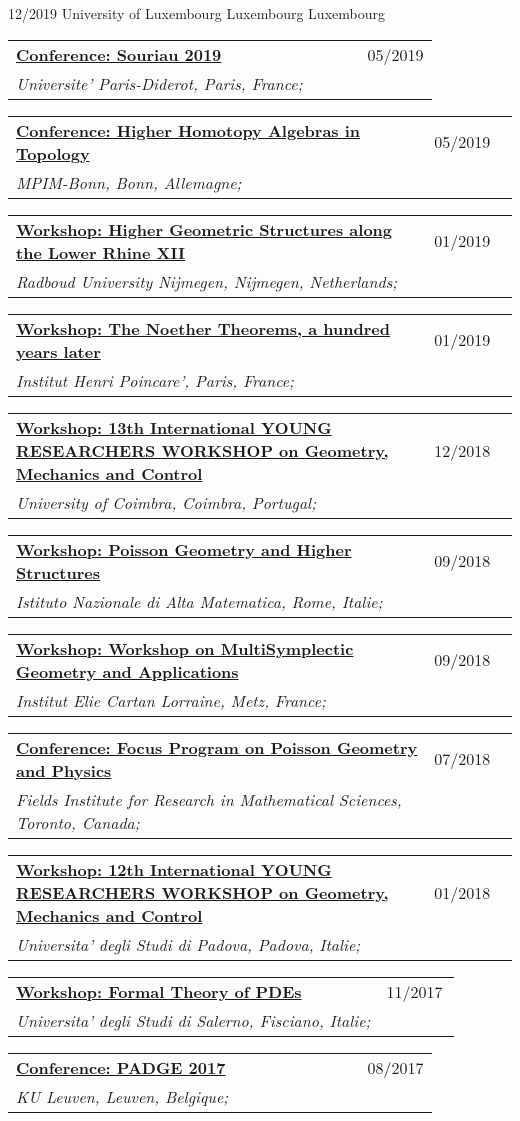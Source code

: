 \documentclass[a4paper]{article}
\newcommand{\longvoice}[8]{
    \begin{tabular}{p{0.83\linewidth} p{0.17\linewidth} }
        \textbf{\href{#3}{#2: #1}} & #4 
        \\ 
        \textit{#5, #6, #7;} & {\small\emph{#8}}
    \end{tabular}
    \vspace{.5em}
    }
\begin{document}
        {12/2019}
        {University of Luxembourg}
        {Luxembourg}
        {Luxembourg}
        {}
    \longvoice{Souriau 2019}
        {Conference}
        {https://web.archive.org/web/20190831102558/http://souriau2019.fr/?page_id=2}
        {05/2019}
        {Universite' Paris-Diderot}
        {Paris}
        {France}
        {}
    \longvoice{Higher Homotopy Algebras in Topology}
        {Conference}
        {https://web.archive.org/web/20190831103619/https://www.mpim-bonn.mpg.de/node/9245}
        {05/2019}
        {MPIM-Bonn}
        {Bonn}
        {Allemagne}
        {}
    \longvoice{Higher Geometric Structures along the Lower Rhine XII}
        {Workshop}
        {https://web.archive.org/web/20190831103524/https://www.math.ru.nl/~sagave/higher-structures-XII/}
        {01/2019}
        {Radboud University Nijmegen}
        {Nijmegen}
        {Netherlands}
        {}
    \longvoice{The Noether Theorems, a hundred years later}
        {Workshop}
        {https://web.archive.org/web/20190831105634/http://noether.iecl.univ-lorraine.fr/noether_en.html}
        {01/2019}
        {Institut Henri Poincare'}
        {Paris}
        {France}
        {}
    \longvoice{13th International YOUNG RESEARCHERS WORKSHOP on Geometry, Mechanics and Control}
        {Workshop}
        {https://web.archive.org/web/20190831103121/http://www.uc.pt/en/congressos/13yrw/programa}
        {12/2018}
        {University of Coimbra}
        {Coimbra}
        {Portugal}
        {}
    \longvoice{Poisson Geometry and Higher Structures}
        {Workshop}
        {https://web.archive.org/web/20190831103317/http://www1.mat.uniroma1.it/ricerca/convegni/2018/hippo2018/index.html}
        {09/2018}
        {Istituto Nazionale di Alta Matematica}
        {Rome}
        {Italie}
        {}
    \longvoice{Workshop on MultiSymplectic Geometry and Applications}
        {Workshop}
        {https://web.archive.org/web/20180704152639/http://www.math.univ-metz.fr/~wurzbacher/GEMSA.html}
        {09/2018}
        {Institut Elie Cartan Lorraine}
        {Metz}
        {France}
        {}
    \longvoice{Focus Program on Poisson Geometry and Physics}
        {Conference}
        {https://web.archive.org/web/20190831105328/http://www.fields.utoronto.ca/activities/18-19/poisson-2018}
        {07/2018}
        {Fields Institute for Research in Mathematical Sciences}
        {Toronto}
        {Canada}
        {}
    \longvoice{12th International YOUNG RESEARCHERS WORKSHOP on Geometry, Mechanics and Control}
        {Workshop}
        {http://events.math.unipd.it/12YRW/}
        {01/2018}
        {Universita' degli Studi di Padova}
        {Padova}
        {Italie}
        {}
    \longvoice{Formal Theory of PDEs}
        {Workshop}
        {http://www.dipmat2.unisa.it/people/vitagliano/www/micro-workshop.html}
        {11/2017}
        {Universita' degli Studi di Salerno}
        {Fisciano}
        {Italie}
        {}
    \longvoice{PADGE 2017}
        {Conference}
        {https://web.archive.org/web/20170924130155/https://wis.kuleuven.be/events/padge2017}
        {08/2017}
        {KU Leuven}
        {Leuven}
        {Belgique}
        {}









        






        
\end{document}
